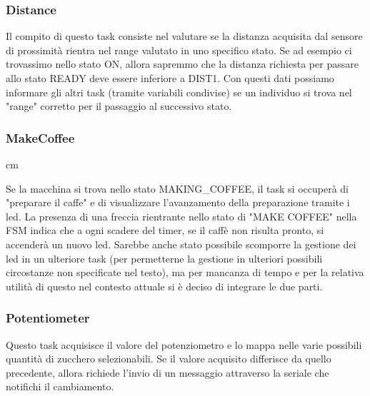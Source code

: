 \documentclass{article}
\begin{document}
\subsubsection{Distance}
Il compito di questo task consiste nel valutare se la distanza acquisita dal sensore di prossimità rientra nel range valutato in uno specifico stato. Se ad esempio ci trovassimo nello stato ON, allora sapremmo che la distanza richiesta per passare allo stato READY deve essere inferiore a DIST1. Con questi dati possiamo informare gli altri task (tramite variabili condivise) se un individuo si trova nel "range" corretto per il passaggio al successivo stato.

\subsubsection{MakeCoffee}
 cm
\begin{center}
\end{center}
Se la macchina si trova nello stato MAKING\_COFFEE, il task si occuperà di "preparare il caffe" e di visualizzare l'avanzamento della preparazione tramite i led. La presenza di una freccia rientrante nello stato di "MAKE COFFEE" nella FSM indica che a ogni scadere del timer, se il caffè non risulta pronto, si accenderà un nuovo led. \newline
Sarebbe anche stato possibile scomporre la gestione dei led in un ulteriore task (per permetterne la gestione in ulteriori possibili circostanze non specificate nel testo), ma per mancanza di tempo e per la relativa utilità di questo nel contesto attuale si è deciso di integrare le due parti.

\subsubsection{Potentiometer}
Questo task acquisisce il valore del potenziometro e lo mappa nelle varie possibili quantità di zucchero selezionabili. Se il valore acquisito differisce da quello precedente, allora richiede l'invio di un messaggio attraverso la seriale che notifichi il cambiamento.
\end{document}

